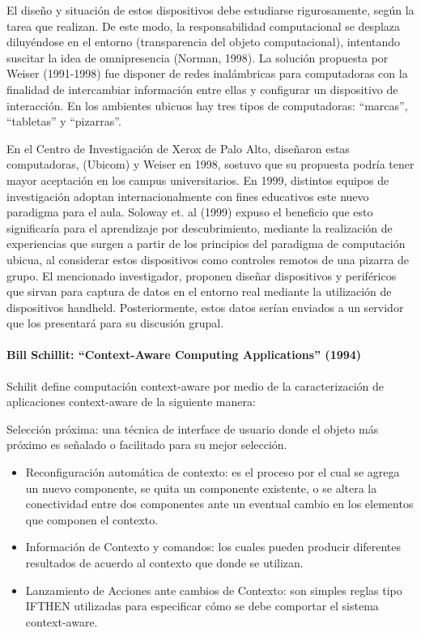 El diseño y situación de estos dispositivos debe estudiarse rigurosamente, según la tarea que realizan. De este modo, la responsabilidad computacional se desplaza diluyéndose en el entorno (transparencia del objeto computacional), intentando suscitar la idea de omnipresencia (Norman, 1998). La solución propuesta por Weiser (1991-1998) fue disponer de redes inalámbricas para computadoras con la finalidad de intercambiar
información entre ellas y configurar un dispositivo de interacción. En los ambientes ubicuos hay tres tipos de computadoras: “marcas”, “tabletas” y “pizarras”.

En el Centro de Investigación de Xerox de Palo Alto, diseñaron estas computadoras, (Ubicom) y Weiser en 1998, sostuvo que su propuesta podría tener mayor aceptación en los campus universitarios. En 1999, distintos equipos de investigación adoptan internacionalmente con fines educativos este nuevo paradigma para el aula.
Soloway et. al (1999) expuso el beneficio que esto significaría para el aprendizaje por descubrimiento, mediante la realización de experiencias que surgen a partir de los principios del paradigma de computación ubicua, al considerar estos dispositivos como controles remotos de una pizarra de grupo. El mencionado investigador, proponen
diseñar dispositivos y periféricos que sirvan para captura de datos en el entorno real mediante la utilización de dispositivos handheld. Posteriormente, estos datos serían enviados a un servidor que los presentará para su discusión grupal.


\paragraph {Bill Schillit: “Context-Aware Computing Applications” (1994)}
  
Schilit define computación context-aware por medio de la caracterización de aplicaciones context-aware de la siguiente manera:

Selección próxima: una técnica de interface de usuario donde el objeto más próximo es señalado o facilitado para su mejor selección.

\begin{itemize}
 \item Reconfiguración automática de contexto: es el proceso por el cual se agrega un nuevo componente, se quita un componente existente, o se altera la conectividad entre dos componentes ante un eventual cambio en los elementos que componen el contexto.

\item
Información de Contexto y comandos: los cuales pueden producir diferentes resultados de acuerdo al contexto que donde se utilizan.

\item Lanzamiento de Acciones ante cambios de Contexto: son simples reglas tipo IFTHEN utilizadas para especificar cómo se debe comportar el sistema context-aware.
\end{itemize}



